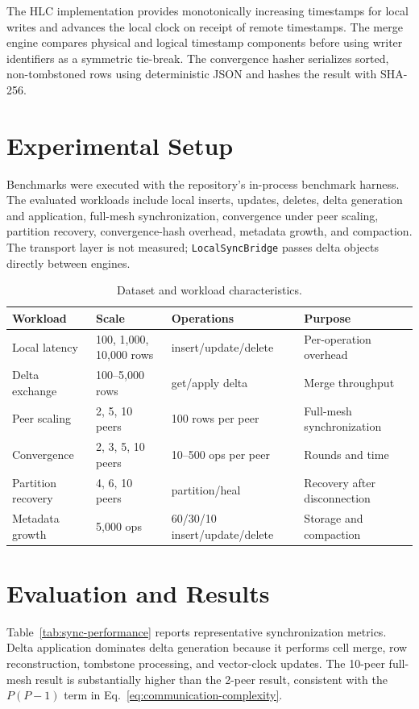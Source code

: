 \documentclass[pdflatex,sn-mathphys-num]{sn-jnl}
\begin{document}
The HLC implementation provides monotonically increasing timestamps for local writes and advances the local clock on receipt of remote timestamps. The merge engine compares physical and logical timestamp components before using writer identifiers as a symmetric tie-break. The convergence hasher serializes sorted, non-tombstoned rows using deterministic JSON and hashes the result with SHA-256.

\section{Experimental Setup}

Benchmarks were executed with the repository's in-process benchmark harness. The evaluated workloads include local inserts, updates, deletes, delta generation and application, full-mesh synchronization, convergence under peer scaling, partition recovery, convergence-hash overhead, metadata growth, and compaction. The transport layer is not measured; \texttt{LocalSyncBridge} passes delta objects directly between engines.

\begin{table}[t]
\centering
\caption{Dataset and workload characteristics.}
\label{tab:datasets}
\begin{tabular}{llll}
\toprule
Workload & Scale & Operations & Purpose \\
\midrule
Local latency & 100, 1,000, 10,000 rows & insert/update/delete & Per-operation overhead \\
Delta exchange & 100--5,000 rows & get/apply delta & Merge throughput \\
Peer scaling & 2, 5, 10 peers & 100 rows per peer & Full-mesh synchronization \\
Convergence & 2, 3, 5, 10 peers & 10--500 ops per peer & Rounds and time \\
Partition recovery & 4, 6, 10 peers & partition/heal & Recovery after disconnection \\
Metadata growth & 5,000 ops & 60/30/10 insert/update/delete & Storage and compaction \\
\bottomrule
\end{tabular}
\end{table}

\section{Evaluation and Results}

Table~\ref{tab:sync-performance} reports representative synchronization metrics. Delta application dominates delta generation because it performs cell merge, row reconstruction, tombstone processing, and vector-clock updates. The 10-peer full-mesh result is substantially higher than the 2-peer result, consistent with the $P(P-1)$ term in Eq.~\eqref{eq:communication-complexity}.
\end{document}
